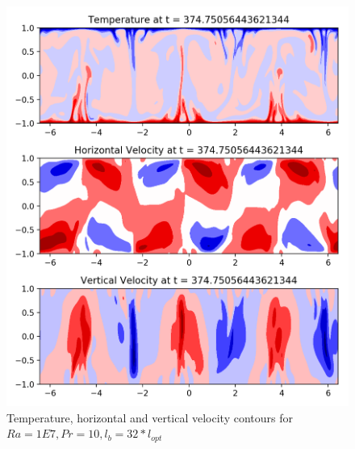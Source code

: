 \documentclass[12pt]{article}
\begin{document}
       \begin{figure}[!htb]
       	\includegraphics[width=\linewidth]{contours_1E7_10_32.png}
       	\caption{Temperature, horizontal and vertical velocity contours for $Ra = 1E7, Pr =10, l_b = 32* l_{opt} $ }
       	\label{fig:fig21}
       \end{figure}
       
\end{document}
